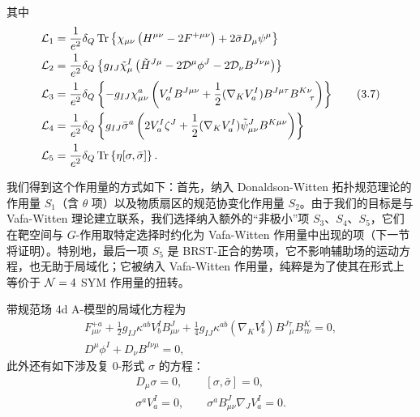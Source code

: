 其中
\begin{align}
  \mathcal{L}_1 &= \frac{1}{e^2}\delta_Q\Tr\left\{\chi_{\mu\nu}\left(H^{\mu\nu}-2F^{+\mu\nu}\right)+2\bar\sigma D_\mu\psi^\mu\right\} \notag\\
  \mathcal{L}_2 &= \frac{1}{e^2}\delta_Q\left\{g_{IJ}\tilde\chi^I_\mu\left(\tilde H^{J\mu}-2\cD^\mu\phi^J-2\cD_\nu B^{J\nu\mu}\right)\right\} \notag\\
  \mathcal{L}_3 &= \frac{1}{e^2}\delta_Q\left\{-g_{IJ}\chi^a_{\mu\nu}\left(V^I_aB^{J\mu\nu}+\frac12(\nabla_KV^I_a)B^{J\mu\tau}B^{K\nu}_{\ \ \ \tau}\right)\right\} \tag{3.7}\\
  \mathcal{L}_4 &= \frac{1}{e^2}\delta_Q\left\{g_{IJ}\bar\sigma^a\left(2V^I_a\zeta^J+\frac12(\nabla_KV^I_a)\tilde\psi^J_{\mu\nu}B^{K\mu\nu}\right)\right\} \notag\\
  \mathcal{L}_5 &= \frac{1}{e^2}\delta_Q\Tr\left\{\eta[\sigma,\bar\sigma]\right\}. \notag
\end{align}

我们得到这个作用量的方式如下：首先，纳入 Donaldson-Witten 拓扑规范理论的作用量 $S_1$（含 $\theta$ 项）以及物质扇区的规范协变化作用量 $S_2$。由于我们的目标是与 Vafa-Witten 理论建立联系，我们选择纳入额外的“非极小”项 $S_3$、$S_4$、$S_5$，它们在靶空间与 $G$-作用取特定选择时约化为 Vafa-Witten 作用量中出现的项（下一节将证明）。特别地，最后一项 $S_5$ 是 BRST-正合的势项，它不影响辅助场的运动方程，也无助于局域化；它被纳入 Vafa-Witten 作用量，纯粹是为了使其在形式上等价于 $\mathcal{N}=4$ SYM 作用量的扭转。

带规范场 4d A-模型的局域化方程为
\begin{gather*}
  F^{+a}_{\mu\nu}+\frac12g_{IJ}\kappa^{ab}V^I_bB^J_{\mu\nu}
    +\tfrac14g_{IJ}\kappa^{ab}(\nabla_KV^I_b)B^{J\tau}_{\ \ \ \mu}B^K_{\tau\nu}=0,\\
  D^\mu\phi^I+D_\nu B^{I\nu\mu}=0,
\end{gather*}
此外还有如下涉及复 0-形式 $\sigma$ 的方程：
\begin{gather*}
  D_\mu\sigma=0,\qquad [\sigma,\bar\sigma]=0,\\
  \sigma^aV^I_a=0,\qquad \sigma^aB^J_{\mu\nu}\nabla_JV^I_a=0.
\end{gather*}


